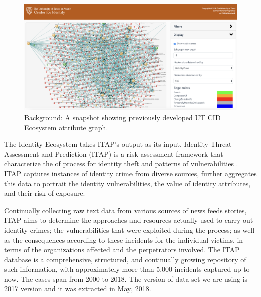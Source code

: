 \documentclass[conference]{IEEEtran}
\begin{document}
\begin{figure}[ht]
  \includegraphics[width=\linewidth]{ecosystem_snapshot.png}
  \caption{Background: A snapshot showing previously developed  UT CID Ecosystem attribute graph.}
  \label{fig:ecosystem_whole}
\end{figure}

The Identity Ecosystem takes ITAP’s output as its input. Identity Threat Assessment and Prediction (ITAP) is a risk assessment framework that characterize the of process for identity theft and patterns of vulnerabilities \cite{ITAP}. ITAP captures instances of identity crime from diverse sources, further aggregates this data to portrait the identity vulnerabilities, the value of identity attributes, and their risk of exposure.

Continually collecting raw text data from various sources of news feeds stories, ITAP
aims to determine the approaches and resources actually used to carry out identity crimes; the vulnerabilities that were exploited during the process; as well as the consequences according to these incidents for the individual victims, in terms of the organizations affected and the perpetrators involved.
The ITAP database is a comprehensive, structured, and continually growing repository of such information, with approximately more than 5,000 incidents captured up to now. The cases span from 2000 to 2018. The version of data set we are using is 2017 version and it was extracted in May, 2018.

\end{document}
